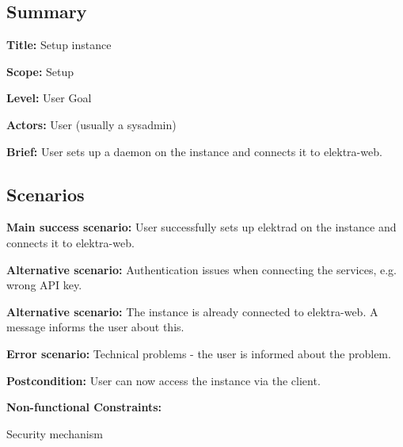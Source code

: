 \subsection*{Summary}


\begin{DoxyItemize}
\item {\bfseries Title\+:} Setup instance
\item {\bfseries Scope\+:} Setup
\item {\bfseries Level\+:} User Goal
\item {\bfseries Actors\+:} User (usually a sysadmin)
\item {\bfseries Brief\+:} User sets up a daemon on the instance and connects it to elektra-\/web.
\end{DoxyItemize}

\subsection*{Scenarios}


\begin{DoxyItemize}
\item {\bfseries Main success scenario\+:} User successfully sets up elektrad on the instance and connects it to elektra-\/web.
\item {\bfseries Alternative scenario\+:} Authentication issues when connecting the services, e.\+g. wrong A\+PI key.
\item {\bfseries Alternative scenario\+:} The instance is already connected to elektra-\/web. A message informs the user about this.
\item {\bfseries Error scenario\+:} Technical problems -\/ the user is informed about the problem.
\item {\bfseries Postcondition\+:} User can now access the instance via the client.
\item {\bfseries Non-\/functional Constraints\+:}
\begin{DoxyItemize}
\item Security mechanism 
\end{DoxyItemize}
\end{DoxyItemize}